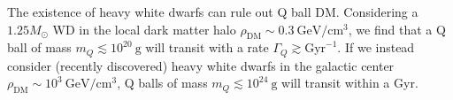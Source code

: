 \documentclass[twocolumn,showpacs,preprintnumbers,amsmath,amssymb,prl]{revtex4}
\begin{document}
The existence of heavy white dwarfs can rule out Q ball DM. Considering a $1.25 M_{\odot}$ WD in the local dark matter halo $\rho_{\text{DM}} \sim 0.3 ~\text{GeV}/\text{cm}^3$, we find that a Q ball of mass $m_Q \lesssim 10^{20} ~\text{g}$ will transit with a rate $\Gamma_Q \gtrsim \text{Gyr}^{-1}$. If we instead consider (recently discovered) heavy white dwarfs in the galactic center $\rho_{\text{DM}} \sim 10^3 ~\text{GeV}/\text{cm}^3$, Q balls of mass $m_Q \lesssim 10^{24} ~\text{g}$ will transit within a Gyr.


\end{document}
